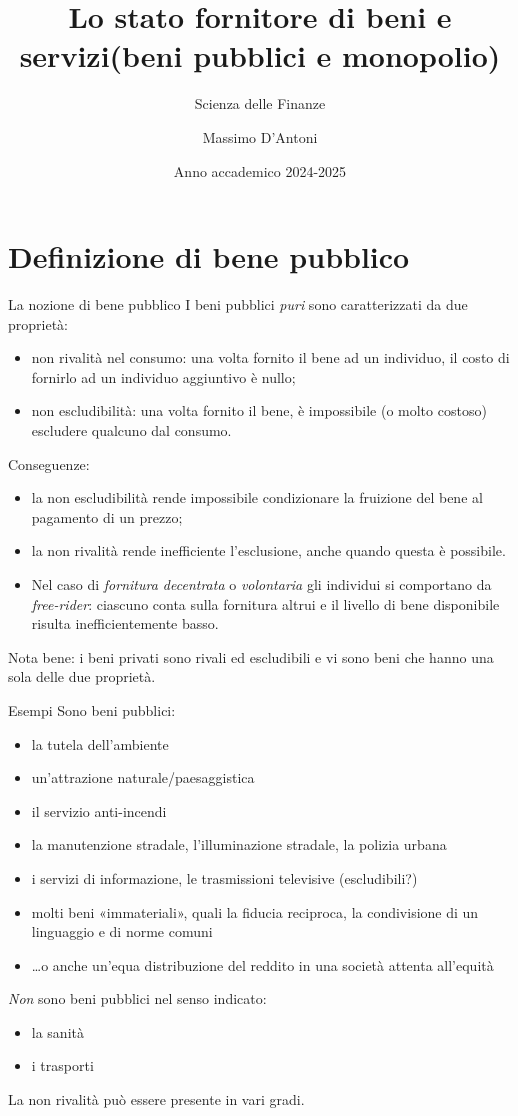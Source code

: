 \documentclass[aspectratio=64,12pt]{beamer}
\institute{Università di Siena}
\author{Massimo D'Antoni}
\date{Anno accademico 2024-2025}
\title{Lo stato fornitore di beni e servizi\newline (beni pubblici e monopolio)}
\subtitle{Scienza delle Finanze}
\institute{Università di Siena}
\begin{document}
\maketitle

\section{Definizione di bene pubblico}

\begin{frame}{La nozione di bene pubblico}
I beni pubblici \emph{puri} sono caratterizzati da due proprietà:
\begin{itemize}
\item \alert{non rivalità nel consumo}: una volta fornito il bene ad un individuo, il costo di fornirlo ad un individuo aggiuntivo è nullo;
\item \alert{non escludibilità}: una volta fornito il bene, è impossibile (o molto costoso) escludere qualcuno dal consumo.
\end{itemize}
Conseguenze:
\begin{itemize}
\item la non escludibilità rende impossibile condizionare la fruizione del bene al pagamento di un prezzo;
\item la non rivalità rende inefficiente l'esclusione, anche quando questa è possibile.
\item Nel caso di \emph{fornitura decentrata} o \emph{volontaria} gli individui si comportano da \emph{free-rider}: ciascuno conta sulla fornitura altrui e il livello di bene disponibile risulta inefficientemente basso.
\end{itemize}  
  Nota bene: i beni privati sono \alert{rivali} ed \alert{escludibili} e vi
  sono beni che hanno una sola delle due proprietà.
\end{frame}


\begin{frame}{Esempi}
Sono beni pubblici:
\begin{itemize}
\item la tutela dell'ambiente
\item un'attrazione naturale/paesaggistica
\item il servizio anti-incendi
\item la manutenzione stradale, l'illuminazione stradale, la polizia urbana
\item i servizi di informazione, le trasmissioni televisive (escludibili?)
\item molti beni «immateriali», quali la fiducia reciproca, la condivisione di un linguaggio e di norme comuni
\item \ldots{}o anche un'equa distribuzione del reddito in una società attenta all'equità
\end{itemize}
\emph{Non} sono beni pubblici nel senso indicato:
\begin{itemize}
\item la sanità
\item i trasporti
\end{itemize}
La non rivalità può essere presente in vari gradi.
\end{frame}
\end{document}
